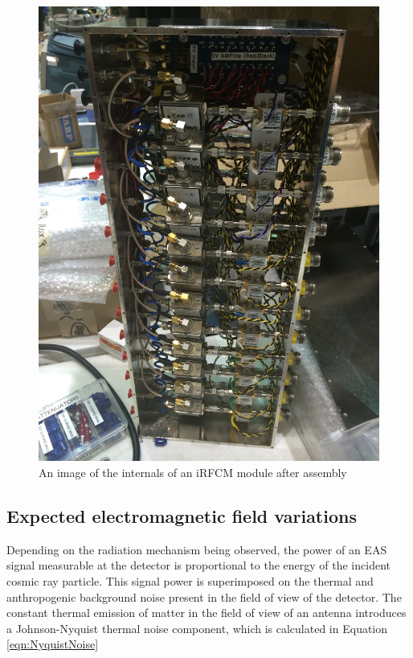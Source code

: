 	
\begin{figure}
\centering
	\includegraphics[height=0.9\textheight]{figures/IRFCMpic}
	\caption{An image of the internals of an iRFCM module after assembly}
	\label{fig:IRFCMpic}
\end{figure}
	
	


	
	\subsection{Expected electromagnetic field variations}
		Depending on the radiation mechanism being observed, the power of an EAS signal measurable at the detector is proportional to the energy of the incident cosmic ray particle.\cite{EASSignalPower}  This signal power is superimposed on the thermal and anthropogenic background noise present in the field of view of the detector.  The constant thermal emission of matter in the field of view of an antenna introduces a Johnson-Nyquist thermal noise component, which is calculated in Equation \ref{eqn:NyquistNoise}


